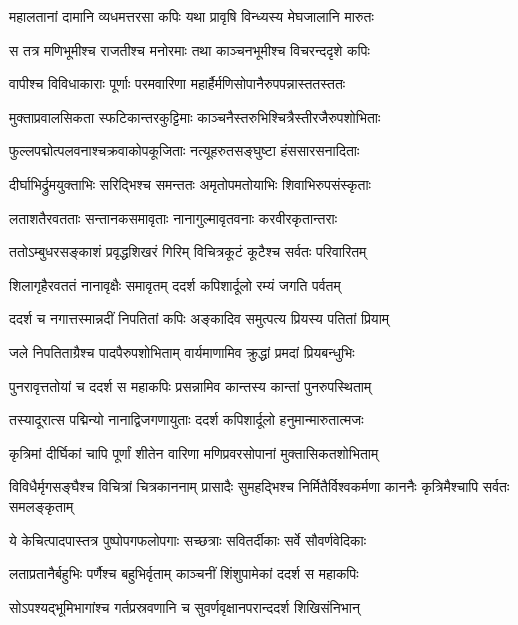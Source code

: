 \twolineshloka
{महालतानां दामानि व्यधमत्तरसा कपिः}
{यथा प्रावृषि विन्ध्यस्य मेघजालानि मारुतः} %

\twolineshloka
{स तत्र मणिभूमीश्च राजतीश्च मनोरमाः}
{तथा काञ्चनभूमीश्च विचरन्ददृशे कपिः} %

\twolineshloka
{वापीश्च विविधाकाराः पूर्णाः परमवारिणा}
{महार्हैर्मणिसोपानैरुपपन्नास्ततस्ततः} %

\twolineshloka
{मुक्ताप्रवालसिकता स्फटिकान्तरकुट्टिमाः}
{काञ्चनैस्तरुभिश्चित्रैस्तीरजैरुपशोभिताः} %

\twolineshloka
{फुल्लपद्मोत्पलवनाश्चक्रवाकोपकूजिताः}
{नत्यूहरुतसङ्घुष्टा हंससारसनादिताः} %

\twolineshloka
{दीर्घाभिर्द्रुमयुक्ताभिः सरिद्भिश्च समन्ततः}
{अमृतोपमतोयाभिः शिवाभिरुपसंस्कृताः} %

\twolineshloka
{लताशतैरवतताः सन्तानकसमावृताः}
{नानागुल्मावृतवनाः करवीरकृतान्तराः} %

\twolineshloka
{ततोऽम्बुधरसङ्काशं प्रवृद्धशिखरं गिरिम्}
{विचित्रकूटं कूटैश्च सर्वतः परिवारितम्} %

\twolineshloka
{शिलागृहैरवततं नानावृक्षैः समावृतम्}
{ददर्श कपिशार्दूलो रम्यं जगति पर्वतम्} %

\twolineshloka
{ददर्श च नगात्तस्मान्नदीं निपतितां कपिः}
{अङ्कादिव समुत्पत्य प्रियस्य पतितां प्रियाम्} %

\twolineshloka
{जले निपतिताग्रैश्च पादपैरुपशोभिताम्}
{वार्यमाणामिव क्रुद्धां प्रमदां प्रियबन्धुभिः} %

\twolineshloka
{पुनरावृत्ततोयां च ददर्श स महाकपिः}
{प्रसन्नामिव कान्तस्य कान्तां पुनरुपस्थिताम्} %

\twolineshloka
{तस्यादूरात्स पद्मिन्यो नानाद्विजगणायुताः}
{ददर्श कपिशार्दूलो हनुमान्मारुतात्मजः} %

\twolineshloka
{कृत्रिमां दीर्घिकां चापि पूर्णां शीतेन वारिणा}
{मणिप्रवरसोपानां मुक्तासिकतशोभिताम्} %

\threelineshloka
{विविधैर्मृगसङ्घैश्च विचित्रां चित्रकाननाम्}
{प्रासादैः सुमहद्भिश्च निर्मितैर्विश्वकर्मणा}
{काननैः कृत्रिमैश्चापि सर्वतः समलङ्कृताम्} %

\twolineshloka
{ये केचित्पादपास्तत्र पुष्पोपगफलोपगाः}
{सच्छत्राः सवितर्दीकाः सर्वे सौवर्णवेदिकाः} %

\twolineshloka
{लताप्रतानैर्बहुभिः पर्णैश्च बहुभिर्वृताम्}
{काञ्चनीं शिंशुपामेकां ददर्श स महाकपिः} %

\twolineshloka
{सोऽपश्यद्भूमिभागांश्च गर्तप्रस्रवणानि च}
{सुवर्णवृक्षानपरान्ददर्श शिखिसंनिभान्} %

